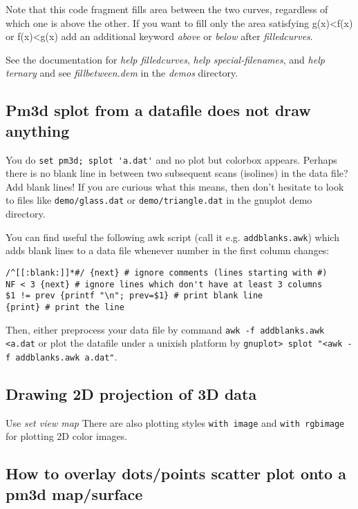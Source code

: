 \documentclass[a4paper,11pt]{article}
\begin{document}
Note that this code fragment fills area between the two curves, regardless of
which one is above the other.  If you want to fill only the area satisfying g(x)<f(x)
or f(x)<g(x)
add an additional keyword \textit{above} or \textit{below} after \textit{filledcurves}.

See the documentation for \textit{help filledcurves}, 
\textit{help special-filenames}, and \textit{help ternary} and see
\textit{fillbetween.dem} in the \textit{demos} directory.


\subsection{Pm3d splot from a datafile does not draw anything}
\label{blank1}

You do \verb+set pm3d; splot 'a.dat'+ and no plot but colorbox appears.
Perhaps there is no blank line in between two subsequent scans (isolines) in
the data file? Add blank lines! If you are curious what this means, then don't
hesitate to look to files like \verb+demo/glass.dat+ or \verb+demo/triangle.dat+
in the gnuplot demo directory.

You can find useful the following awk script (call it e.g. \verb+addblanks.awk+)
which adds blank lines to a data file whenever number in the first column
changes:
\small
\begin{verbatim}
/^[[:blank:]]*#/ {next} # ignore comments (lines starting with #)
NF < 3 {next} # ignore lines which don't have at least 3 columns
$1 != prev {printf "\n"; prev=$1} # print blank line
{print} # print the line
\end{verbatim}
\normalsize
Then, either preprocess your data file by command
\verb+awk -f addblanks.awk <a.dat+ or plot the datafile under a unixish platform
by \verb+gnuplot> splot "<awk -f addblanks.awk a.dat"+.


\subsection{Drawing 2D projection of 3D data}

Use \textit{set view map}
There are also plotting styles \verb+with image+ and \verb+with rgbimage+
for plotting 2D color images.

\subsection{How to overlay dots/points scatter plot onto a pm3d map/surface}
\end{document}
